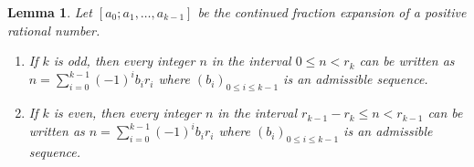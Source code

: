 \documentclass[a4paper,12pt]{amsart}
\newtheorem{lemma}[definition]{Lemma}
\newcommand{\0}{\mathtt{0}}
\newcommand{\1}{\mathtt{1}}
\newcommand{\2}{\mathtt{2}}
\newcommand{\3}{\mathtt{3}}
\begin{document}
\begin{lemma}\label{lem:existence-rep-in-interval}
    Let $[a_0; a_1, \dots, a_{k-1}]$ be the continued fraction expansion
    of a positive rational number.
    \begin{enumerate}
        \item If $k$ is odd, then every integer $n$ in the interval
                $0\leq n< r_{k}$
                can be written as
                $
                    n = \sum_{i=0}^{k-1} (-1)^{i}b_{i}r_{i}
                $
                where $(b_i)_{0\leq i\leq k-1}$ is an admissible sequence.
        \item If $k$ is even, then every integer $n$ in the interval
                $r_{k-1}-r_{k}\leq n< r_{k-1}$
                can be written as
                $
                    n = \sum_{i=0}^{k-1} (-1)^{i}b_{i}r_{i}
                $
                where $(b_i)_{0\leq i\leq k-1}$ is an admissible sequence.
    \end{enumerate}
\end{lemma}
\end{document}
